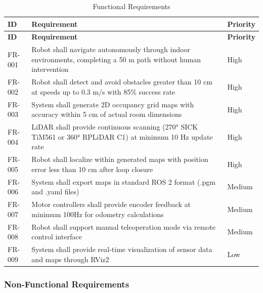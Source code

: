 \begin{longtable}{@{}lp{}l@{}}
\caption{Functional Requirements}
\label{tab:functional_reqs} \\
\toprule
\textbf{ID} & \textbf{Requirement} & \textbf{Priority} \\
\midrule
\endfirsthead
\toprule
\textbf{ID} & \textbf{Requirement} & \textbf{Priority} \\
\midrule
\endhead
\bottomrule
\endfoot
FR-001 & Robot shall navigate autonomously through indoor environments, completing a 50 m path without human intervention & High \\
FR-002 & Robot shall detect and avoid obstacles greater than 10 cm at speeds up to 0.3 m/s with 85\% success rate & High \\
FR-003 & System shall generate 2D occupancy grid maps with accuracy within 5 cm of actual room dimensions & High \\
FR-004 & LiDAR shall provide continuous scanning (270° SICK TiM561 or 360° RPLiDAR C1) at minimum 10 Hz update rate & High \\
FR-005 & Robot shall localize within generated maps with position error less than 10 cm after loop closure & High \\
FR-006 & System shall export maps in standard ROS 2 format (.pgm and .yaml files) & Medium \\
FR-007 & Motor controllers shall provide encoder feedback at minimum 100Hz for odometry calculations & Medium \\
FR-008 & Robot shall support manual teleoperation mode via remote control interface & Medium \\
FR-009 & System shall provide real-time visualization of sensor data and maps through RViz2 & Low \\
\end{longtable}

\subsubsection{Non-Functional Requirements}

